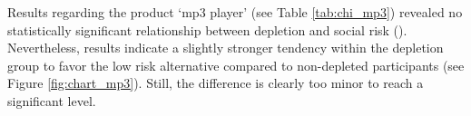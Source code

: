 Results regarding the product ‘mp3 player’ (see Table \ref{tab:chi_mp3}) revealed no statistically significant relationship between depletion and social risk (). Nevertheless, results indicate a slightly stronger tendency within the depletion group to favor the low risk alternative compared to non-depleted participants (see Figure \ref{fig:chart_mp3}). Still, the difference is clearly too minor to reach a significant level. 

\begin{figure}[!h]
\begin{floatrow}
\capbfigbox{%

}
\end{floatrow}
\end{figure}
